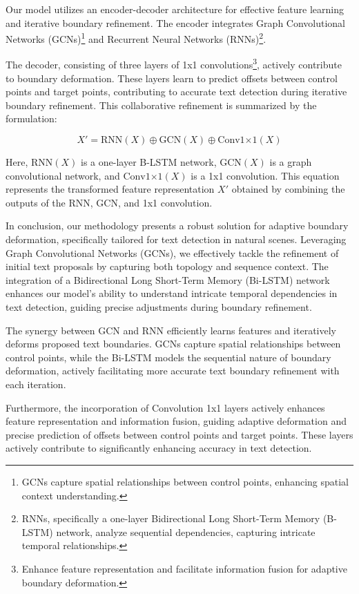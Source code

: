\documentclass[default,iicol]{sn-jnl}%
\begin{document}
Our model utilizes an encoder-decoder architecture for effective feature learning and iterative boundary refinement. The encoder integrates Graph Convolutional Networks (GCNs)\protect\footnote{GCNs capture spatial relationships between control points, enhancing spatial context understanding.} and Recurrent Neural Networks (RNNs)\protect\footnote{RNNs, specifically a one-layer Bidirectional Long Short-Term Memory (B-LSTM) network, analyze sequential dependencies, capturing intricate temporal relationships.}.

The decoder, consisting of three layers of 1x1 convolutions\protect\footnote{Enhance feature representation and facilitate information fusion for adaptive boundary deformation.}, actively contribute to boundary deformation. These layers learn to predict offsets between control points and target points, contributing to accurate text detection during iterative boundary refinement. This collaborative refinement is summarized by the formulation:

\begin{equation}
	X' = \text{{RNN}}(X) \oplus \text{{GCN}}(X) \oplus \text{{Conv1×1}}(X)
\end{equation}

Here, $\text{{RNN}}(X)$ is a one-layer B-LSTM network, $\text{{GCN}}(X)$ is a graph convolutional network, and $\text{{Conv1×1}}(X)$ is a 1x1 convolution. This equation represents the transformed feature representation $X'$ obtained by combining the outputs of the RNN, GCN, and 1x1 convolution.

In conclusion, our methodology presents a robust solution for adaptive boundary deformation, specifically tailored for text detection in natural scenes. Leveraging Graph Convolutional Networks (GCNs), we effectively tackle the refinement of initial text proposals by capturing both topology and sequence context. The integration of a Bidirectional Long Short-Term Memory (Bi-LSTM) network enhances our model's ability to understand intricate temporal dependencies in text detection, guiding precise adjustments during boundary refinement.

The synergy between GCN and RNN efficiently learns features and iteratively deforms proposed text boundaries. GCNs capture spatial relationships between control points, while the Bi-LSTM models the sequential nature of boundary deformation, actively facilitating more accurate text boundary refinement with each iteration.

Furthermore, the incorporation of Convolution 1x1 layers actively enhances feature representation and information fusion, guiding adaptive deformation and precise prediction of offsets between control points and target points. These layers actively contribute to significantly enhancing accuracy in text detection.
\end{document}
